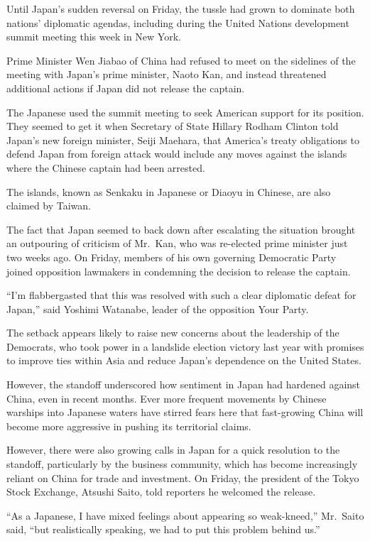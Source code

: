 ﻿\documentclass[12pt]{article}
\begin{document}
Until Japan's sudden reversal on Friday, the tussle had grown to dominate both nations' diplomatic
agendas, including during the United Nations development summit meeting this week in New York.

Prime Minister Wen Jiabao of China had refused to meet on the sidelines of the meeting with Japan's
prime minister, Naoto Kan, and instead threatened additional actions if Japan did not release the
captain.

The Japanese used the summit meeting to seek American support for its position. They seemed to get
it when Secretary of State Hillary Rodham Clinton told Japan's new foreign minister, Seiji Maehara,
that America's treaty obligations to defend Japan from foreign attack would include any moves
against the islands where the Chinese captain had been arrested.

The islands, known as Senkaku in Japanese or Diaoyu in Chinese, are also claimed by Taiwan.

The fact that Japan seemed to back down after escalating the situation brought an outpouring of
criticism of Mr.~Kan, who was re-elected prime minister just two weeks ago. On Friday, members of
his own governing Democratic Party joined opposition lawmakers in condemning the decision to release
the captain.

``I'm flabbergasted that this was resolved with such a clear diplomatic defeat for Japan,'' said
Yoshimi Watanabe, leader of the opposition Your Party.

The setback appears likely to raise new concerns about the leadership of the Democrats, who took
power in a landslide election victory last year with promises to improve ties within Asia and reduce
Japan's dependence on the United States.

However, the standoff underscored how sentiment in Japan had hardened against China, even in recent
months. Ever more frequent movements by Chinese warships into Japanese waters have stirred fears
here that fast-growing China will become more aggressive in pushing its territorial claims.

However, there were also growing calls in Japan for a quick resolution to the standoff, particularly
by the business community, which has become increasingly reliant on China for trade and investment.
On Friday, the president of the Tokyo Stock Exchange, Atsushi Saito, told reporters he welcomed the
release.

``As a Japanese, I have mixed feelings about appearing so weak-kneed,'' Mr.~Saito said, ``but
realistically speaking, we had to put this problem behind us.''
\end{document}

